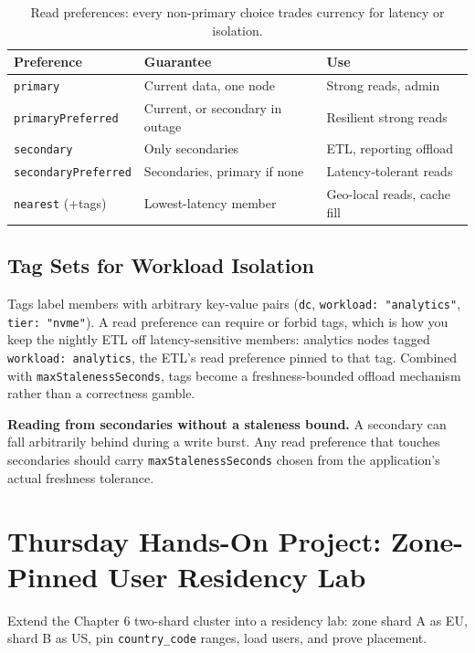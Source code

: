 \begin{table}[H]
\centering\footnotesize
\begin{tabular}{@{}p{3.2cm}p{4.6cm}p{5.4cm}@{}}
\toprule
\textbf{Preference} & \textbf{Guarantee} & \textbf{Use} \\
\midrule
\texttt{primary} & Current data, one node & Strong reads, admin \\
\texttt{primaryPreferred} & Current, or secondary in outage & Resilient strong reads \\
\texttt{secondary} & Only secondaries & ETL, reporting offload \\
\texttt{secondaryPreferred} & Secondaries, primary if none & Latency-tolerant reads \\
\texttt{nearest} (+tags) & Lowest-latency member & Geo-local reads, cache fill \\
\bottomrule
\end{tabular}
\caption{Read preferences: every non-primary choice trades currency for latency or isolation.}
\label{tab:ch12-readpref}
\end{table}

\subsection{Tag Sets for Workload Isolation}
Tags label members with arbitrary key-value pairs (\texttt{dc}, \texttt{workload: "analytics"}, \texttt{tier: "nvme"}). A read preference can require or forbid tags, which is how you keep the nightly ETL off latency-sensitive members: analytics nodes tagged \texttt{workload: analytics}, the ETL's read preference pinned to that tag. Combined with \texttt{maxStalenessSeconds}, tags become a freshness-bounded offload mechanism rather than a correctness gamble.

\begin{pitfall}
\textbf{Reading from secondaries without a staleness bound.} A secondary can fall arbitrarily behind during a write burst. Any read preference that touches secondaries should carry \texttt{maxStalenessSeconds} chosen from the application's actual freshness tolerance.
\end{pitfall}

\section{Thursday Hands-On Project: Zone-Pinned User Residency Lab}
Extend the Chapter 6 two-shard cluster into a residency lab: zone shard A as EU, shard B as US, pin \texttt{country\_code} ranges, load users, and prove placement.

